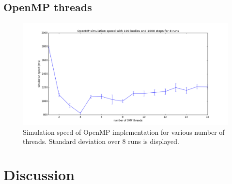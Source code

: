\documentclass[a4paper,11pt]{scrartcl} %
\begin{document}
\subsection{OpenMP threads}
\begin{figure}[h!]
  \centering
  \includegraphics[width=\textwidth]{img/benchmark_omp.png}
  \caption{Simulation speed of OpenMP implementation for various number of threads. Standard deviation over 8 runs is displayed.}
  \label{fig:figure1}
\end{figure}

\section{Discussion}

\newpage
{}

\end{document}
